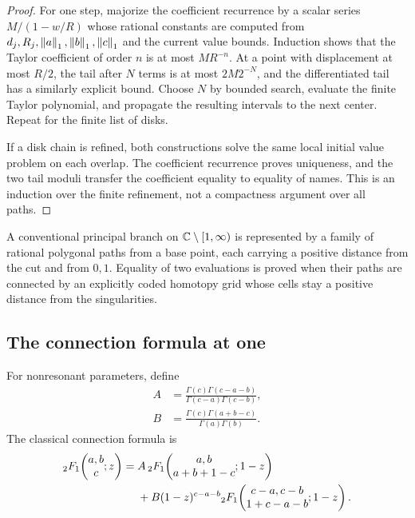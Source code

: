\begin{proof}
For one step, majorize the coefficient recurrence by a scalar series
\(M/(1-w/R)\) whose rational constants are computed from
\(d_j,R_j,\left\lVert a\right\rVert_1,\left\lVert b\right\rVert_1,\left\lVert c\right\rVert_1\) and the current value bounds.  Induction
shows that the Taylor coefficient of order \(n\) is at most \(MR^{-n}\).
At a point with displacement at most \(R/2\), the tail after \(N\) terms is
at most \(2M2^{-N}\), and the differentiated tail has a similarly explicit
bound.  Choose \(N\) by bounded search, evaluate the finite Taylor polynomial,
and propagate the resulting intervals to the next center.  Repeat for the
finite list of disks.

If a disk chain is refined, both constructions solve the same local initial
value problem on each overlap.  The coefficient recurrence proves uniqueness,
and the two tail moduli transfer the coefficient equality to equality of
names.  This is an induction over the finite refinement, not a compactness
argument over all paths.
\end{proof}

\begin{corollary}
A conventional principal branch on
\(\mathbb C\setminus[1,\infty)\) is represented by a family of rational polygonal
paths from a base point, each carrying a positive distance from the cut and
from \(0,1\).  Equality of two evaluations is proved when their paths are
connected by an explicitly coded homotopy grid whose cells stay a positive
distance from the singularities.
\end{corollary}

\subsection{The connection formula at one}

For nonresonant parameters, define
\begin{align*}
 A&=\frac{\Gamma(c)\Gamma(c-a-b)}
         {\Gamma(c-a)\Gamma(c-b)},\\
 B&=\frac{\Gamma(c)\Gamma(a+b-c)}
         {\Gamma(a)\Gamma(b)}.
\end{align*}
The classical connection formula is
\begin{equation}\label{eq:connection-one}
\begin{split}
 {}_2F_1\!\left(\begin{matrix}a,b\\c\end{matrix};z\right)={}&A\,
 {}_2F_1\!\left(\begin{matrix}a,b\\a+b+1-c\end{matrix};1-z\right)\\
 &+B(1-z)^{c-a-b}
 {}_2F_1\!\left(\begin{matrix}c-a,c-b\\1+c-a-b\end{matrix};1-z\right).
\end{split}
\end{equation}

